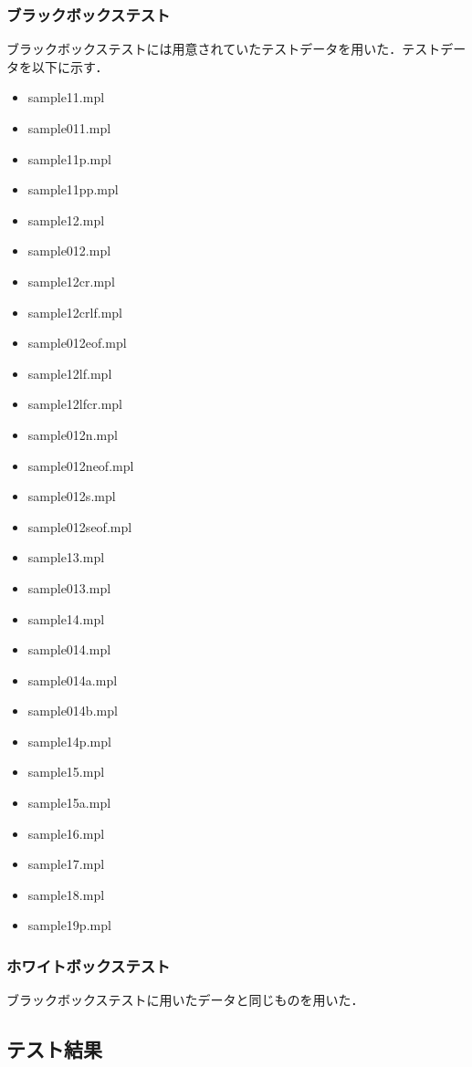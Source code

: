\documentclass{jlreq}
\begin{document}
\subsubsection{ブラックボックステスト}
ブラックボックステストには用意されていたテストデータを用いた．テストデータを以下に示す．
\begin{itemize}
  \item sample11.mpl
  \item sample011.mpl
  \item sample11p.mpl
  \item sample11pp.mpl
  \item sample12.mpl
  \item sample012.mpl
  \item sample12cr.mpl
  \item sample12crlf.mpl
  \item sample012eof.mpl
  \item sample12lf.mpl
  \item sample12lfcr.mpl
  \item sample012n.mpl
  \item sample012neof.mpl
  \item sample012s.mpl
  \item sample012seof.mpl
  \item sample13.mpl
  \item sample013.mpl
  \item sample14.mpl
  \item sample014.mpl
  \item sample014a.mpl
  \item sample014b.mpl
  \item sample14p.mpl
  \item sample15.mpl
  \item sample15a.mpl
  \item sample16.mpl
  \item sample17.mpl
  \item sample18.mpl
  \item sample19p.mpl
\end{itemize}

\subsubsection{ホワイトボックステスト}
ブラックボックステストに用いたデータと同じものを用いた．

\subsection{テスト結果}
\end{document}
